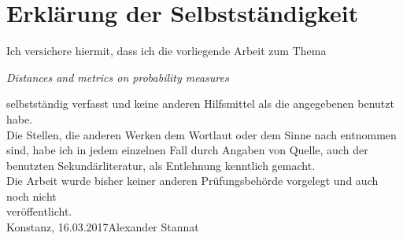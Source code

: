 \documentclass[11pt,a4paper]{article}
\begin{document}
\section*{Erklärung der Selbstständigkeit}
Ich versichere hiermit, dass ich die vorliegende Arbeit zum Thema 
\begin{center}
{\sl Distances and metrics on probability measures }
\end{center}
selbstständig verfasst und keine anderen Hilfsmittel als die angegebenen benutzt habe. \\Die Stellen, die anderen Werken dem Wortlaut oder dem Sinne nach entnommen sind, habe ich in jedem einzelnen Fall durch Angaben von Quelle, auch der benutzten Sekundärliteratur,
als Entlehnung kenntlich gemacht.\\Die Arbeit wurde bisher keiner anderen Prüfungsbehörde vorgelegt und auch noch nicht\\
veröffentlicht.\vspace{5em}\\
Konstanz, 16.03.2017\hspace{10em}Alexander Stannat
\end{document}
